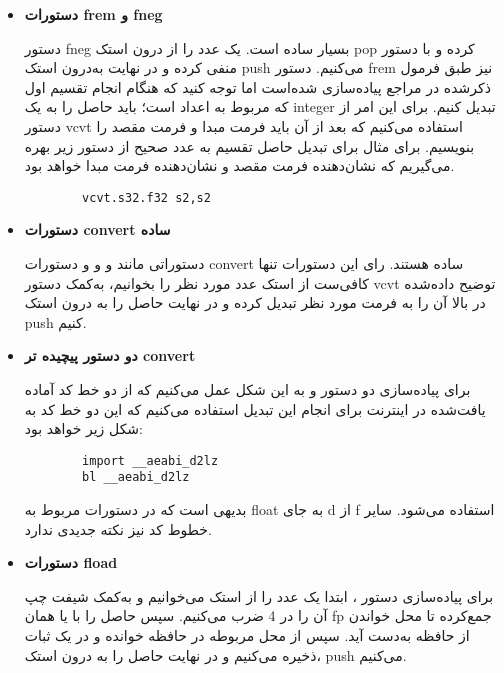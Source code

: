 \begin{itemize}
	\item\textbf{
		دستورات frem و fneg
	}
	
	دستور fneg بسیار ساده است. یک عدد را از درون استک pop کرده و با دستور
	منفی کرده و در نهایت به‌درون استک push می‌کنیم. دستور frem نیز طبق فرمول ذکرشده در مراجع پیاده‌سازی شده‌است اما توجه کنید که هنگام انجام تقسیم اول که مربوط به اعداد
	است؛ باید حاصل را به یک integer تبدیل کنیم. برای این امر از دستور vcvt استفاده می‌کنیم که بعد از آن باید فرمت مبدا و فرمت مقصد را بنویسیم. برای مثال برای تبدیل حاصل
	تقسیم به عدد صحیح از دستور زیر بهره می‌گیریم که
	نشان‌دهنده فرمت مقصد و
	نشان‌دهنده فرمت مبدا خواهد بود.
	
	\begin{latin}
		\begin{verbatim}
		vcvt.s32.f32 s2,s2 
		\end{verbatim}
	\end{latin}
	
	\item \textbf{
		دستورات convert 
		ساده
	}
	
	دستوراتی مانند
	و
	و 
	و
	دستورات
	convert
	ساده هستند. 
	رای این دستورات تنها کافی‌ست از استک عدد مورد نظر را بخوانیم، به‌کمک دستور vcvt توضیح داده‌شده در بالا آن را به فرمت مورد نظر تبدیل کرده و در نهایت حاصل را به درون استک push کنیم.
	
	
	\item \textbf{
		دو دستور پیچیده تر convert
	}
	
	برای پیاده‌سازی دو دستور
	و
	به این شکل عمل می‌کنیم که از دو خط کد آماده یافت‌شده در اینترنت برای انجام این تبدیل استفاده می‌کنیم که این دو خط کد به شکل زیر خواهد بود:
	
	
	\begin{latin}
		\begin{verbatim}
		import __aeabi_d2lz 
		bl __aeabi_d2lz
		\end{verbatim}
	\end{latin}
	
	بدیهی است که در دستورات مربوط به float به جای d از f استفاده می‌شود. سایر خطوط کد نیز نکته جدیدی ندارد.
	
	\item \textbf{
		دستورات fload
	}
	
	
	برای پیاده‌سازی دستور
	،
	ابتدا یک عدد را از استک می‌خوانیم و به‌کمک شیفت چپ آن را در 4 ضرب می‌کنیم. سپس حاصل را با
	یا همان fp جمع‌کرده تا محل خواندن از حافظه به‌دست آید. سپس از محل مربوطه در حافظه خوانده و در یک ثبات ذخیره می‌کنیم و در نهایت حاصل را به درون استک، push می‌کنیم.
	

\end{itemize}
